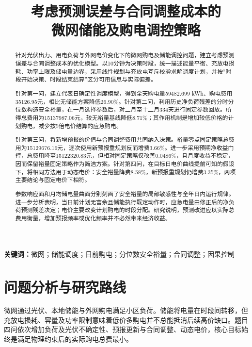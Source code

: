 \documentclass[UTF8,a4paper,zihao=-4,fontset=fandol]{ctexart}
\title{\heiti 考虑预测误差与合同调整成本的\\微网储能及购电调控策略}
\author{}\date{}
\begin{document}
\maketitle\vspace{-3em}\thispagestyle{plain}
\begin{abstract}
针对光伏出力、用电负荷与外网电价变化下的微网购电及储能调控问题，建立考虑预测误差与合同调整成本的优化模型。以10分钟为决策时段，统一描述能量平衡、充放电损耗、功率上限及储电量边界，采用线性规划与充放电互斥校验求解调度计划，并按“时段开始决策、时段结束结算”区分可用信息与实际偏差。

针对第一问，建立代表日确定性调度模型，得到全天购电量59482.699 kWh、购电费用35126.95元，相比无储能方案降低26.90\%。针对第二问，利用历史净负荷残差的分时分位数构造安全裕量，在一月选择参数后，对二月至十二月334天进行固定参数回放。所得总费用为15137987.06元，较无裕量基线降低8.71\%；其作用机制是增加较低价格的计划购电，减少按5倍电价结算的应急购电。

针对第三问，将新增预报的价值与合同调整费用共同纳入决策。裕量零点固定策略总费用为15129676.16元，逐次使用新预报重规划反而增费3.66\%。进一步采用预期净收益门控，总费用降至15122320.83元，但相对固定策略仅改善0.0486\%，且月度收益不稳定，因而保留裕量固定策略作为简洁方案。针对第四问，在目标日电价曲线提前可知的假设下，将相同方法用于动态电价：安全裕量降费8.58\%，新预报重规划仍增费3.35\%，两项主要结论与固定电价下相符。

参数响应面和月均储电量曲面分别刻画了安全裕量的局部敏感性与全年日内运行规律。进一步分析表明，当日前计划无富余且储能执行既定动作时，应急电量由修正后的净负荷预测残差决定；电价主要改变计划购电的时段分配。研究说明，预测改进应以实际总费用衡量，增加预报频率或优化频率并不必然带来经济收益。

\end{abstract}
\noindent\textbf{关键词：}微网；储能调度；日前购电；分位数安全裕量；合同调整；因果控制
\newpage
\FloatBarrier
\section{问题分析与研究路线}
微网通过光伏、本地储能与外网购电满足小区负荷。储能将电量在时段间转移，但充放电损耗、容量及功率限制意味着低价多购电并不总能抵消后续高价缺口。题目四问依次增加负荷及光伏不确定性、预报更新与合同调整、动态电价，核心目标始终是满足物理约束后的实际购电总费最小\cite{problem}。
\end{document}
